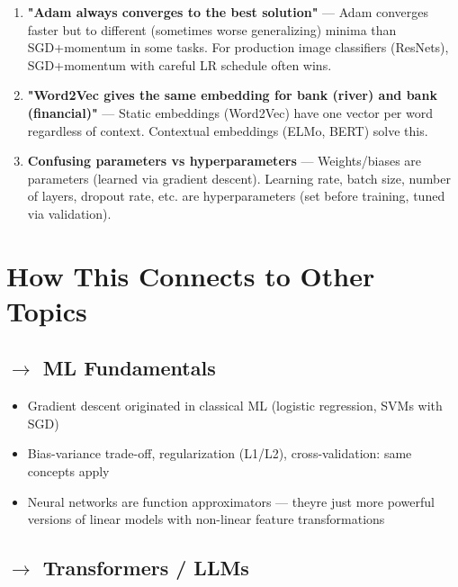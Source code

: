 \documentclass[11pt]{article}
\providecommand{\tightlist}{\setlength{\itemsep}{1pt}\setlength{\parskip}{0pt}}
\begin{document}
\begin{enumerate}
  \textbf{"More layers always helps"} --- Without residual connections, adding layers often hurts (degradation problem). Depth needs to be matched with appropriate architectural choices.
\item
  \textbf{"Adam always converges to the best solution"} --- Adam converges faster but to different (sometimes worse generalizing) minima than SGD+momentum in some tasks. For production image classifiers (ResNets), SGD+momentum with careful LR schedule often wins.
\item
  \textbf{"Word2Vec gives the same embedding for \textquotesingle bank\textquotesingle{} (river) and \textquotesingle bank\textquotesingle{} (financial)"} --- Static embeddings (Word2Vec) have one vector per word regardless of context. Contextual embeddings (ELMo, BERT) solve this.
\item
  \textbf{Confusing parameters vs hyperparameters} --- Weights/biases are parameters (learned via gradient descent). Learning rate, batch size, number of layers, dropout rate, etc. are hyperparameters (set before training, tuned via validation).
\end{enumerate}

\section{How This Connects to Other Topics}\label{how-this-connects-to-other-topics}

\subsection{\texorpdfstring{\(\rightarrow\) ML Fundamentals}{\textbackslash rightarrow ML Fundamentals}}\label{rightarrow-ml-fundamentals}

\begin{itemize}
\tightlist
\item
  Gradient descent originated in classical ML (logistic regression, SVMs with SGD)
\item
  Bias-variance trade-off, regularization (L1/L2), cross-validation: same concepts apply
\item
  Neural networks are function approximators --- they\textquotesingle re just more powerful versions of linear models with non-linear feature transformations
\end{itemize}

\subsection{\texorpdfstring{\(\rightarrow\) Transformers / LLMs}{\textbackslash rightarrow Transformers / LLMs}}\label{rightarrow-transformers--llms}
\end{document}
